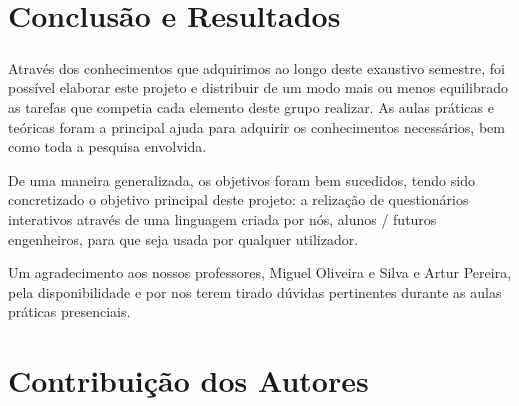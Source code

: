 \documentclass{report}
\begin{document}




\chapter{Conclusão e Resultados}
\label{chap.conclusao}

\paragraph{} 

Através dos conhecimentos que adquirimos ao longo deste exaustivo semestre, foi possível elaborar este projeto e distribuir de um modo mais ou menos equilibrado as tarefas que competia cada elemento deste grupo realizar. 
As aulas práticas e teóricas foram a principal ajuda para adquirir os conhecimentos necessários, bem como toda a pesquisa envolvida.

De uma maneira generalizada, os objetivos foram bem sucedidos, tendo sido concretizado o objetivo principal deste projeto: a relização de questionários interativos através de uma linguagem criada por nós, alunos / futuros engenheiros, para que seja usada por qualquer utilizador.

Um agradecimento aos nossos professores, Miguel Oliveira e Silva e Artur Pereira, pela disponibilidade e por nos terem tirado dúvidas pertinentes durante as aulas práticas presenciais.




\chapter{Contribuição dos Autores}
\label{chap.autores}

\paragraph{} 


\end{document}
